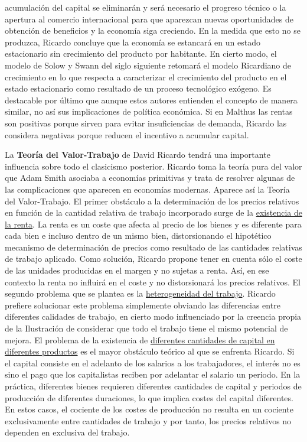 \documentclass{nuevotema}
\begin{document}
acumulación del capital se eliminarán y será necesario el progreso técnico o la apertura al comercio internacional para que aparezcan nuevas oportunidades de obtención de beneficios y la economía siga creciendo. En la medida que esto no se produzca, Ricardo concluye que la economía se estancará en un estado estacionario sin crecimiento del producto por habitante. En cierto modo, el modelo de Solow y Swann del siglo siguiente retomará el modelo Ricardiano de crecimiento en lo que respecta a caracterizar el crecimiento del producto en el estado estacionario como resultado de un proceso tecnológico exógeno. Es destacable por último que aunque estos autores entienden el concepto de manera similar, no así sus implicaciones de política económica. Si en Malthus las rentas son positivas porque sirven para evitar insuficiencias de demanda, Ricardo las considera negativas porque reducen el incentivo a acumular capital.

La \textbf{Teoría del Valor-Trabajo} de David Ricardo tendrá una importante influencia sobre todo el clasicismo posterior. Ricardo toma la teoría pura del valor que Adam Smith asociaba a economías primitivas y trata de resolver algunas de las complicaciones que aparecen en economías modernas. Aparece así la Teoría del Valor-Trabajo. El primer obstáculo a la determinación de los precios relativos en función de la cantidad relativa de trabajo incorporado surge de la \underline{existencia de la renta}. La renta es un coste que afecta al precio de los bienes y es diferente para cada bien e incluso dentro de un mismo bien, distorsionando el hipotético mecanismo de determinación de precios como resultado de las cantidades relativas de trabajo aplicado. Como solución, Ricardo propone tener en cuenta sólo el coste de las unidades producidas en el margen y no sujetas a renta. Así, en ese contexto la renta no influirá en el coste y no distorsionará los precios relativos. El segundo problema que se plantea es la \underline{heterogeneidad del trabajo}. Ricardo prefiere solucionar este problema simplemente obviando las diferencias entre diferentes calidades de trabajo, en cierto modo influenciado por la creencia propia de la Ilustración de considerar que todo el trabajo tiene el mismo potencial de mejora. El problema de la existencia de \underline{diferentes cantidades de capital en diferentes productos} es el mayor obstáculo teórico al que se enfrenta Ricardo. Si el capital consiste en el adelanto de los salarios a los trabajadores, el interés no es sino el pago que los capitalistas reciben por adelantar el salario un periodo. En la práctica, diferentes bienes requieren diferentes cantidades de capital y periodos de producción de diferentes duraciones, lo que implica costes del capital diferentes. En estos casos, el cociente de los costes de producción no resulta en un cociente exclusivamente entre cantidades de trabajo y por tanto, los precios relativos no dependen en exclusiva del trabajo.
\end{document}
